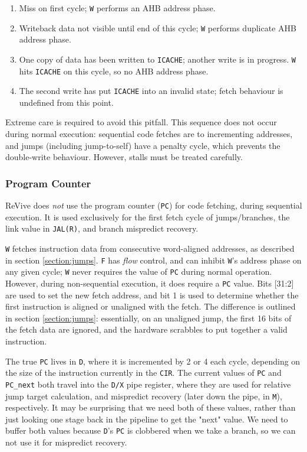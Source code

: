 \documentclass{article}
\begin{document}
\begin{enumerate}
	\item Miss on first cycle; \texttt{W} performs an AHB address phase.
	\item Writeback data not visible until end of this cycle; \texttt{W} performs duplicate AHB address phase.
	\item One copy of data has been written to \texttt{ICACHE}; another write is in progress. \texttt{W} hits \texttt{ICACHE} on this cycle, so no AHB address phase.
	\item The second write has put \texttt{ICACHE} into an invalid state; fetch behaviour is undefined from this point.
\end{enumerate}

Extreme care is required to avoid this pitfall. This sequence does not occur during normal execution: sequential code fetches are to incrementing addresses, and jumps (including jump-to-self) have a penalty cycle, which prevents the double-write behaviour. However, stalls must be treated carefully.

\subsubsection{Program Counter}

ReVive does \textit{not} use the program counter (\texttt{PC}) for code fetching, during sequential execution. It is used exclusively for the first fetch cycle of jumps/branches, the link value in \texttt{JAL(R)}, and branch mispredict recovery.

\texttt{W} fetches instruction data from consecutive word-aligned addresses, as described in section \ref{section:jumps}. \texttt{F} has \textit{flow} control, and can inhibit \texttt{W}'s address phase on any given cycle; \texttt{W} never requires the value of \texttt{PC} during normal operation. However, during non-sequential execution, it does require a \texttt{PC} value. Bits [31:2] are used to set the new fetch address, and bit 1 is used to determine whether the first instruction is aligned or unaligned with the fetch. The difference is outlined in section \ref{section:jumps}: essentially, on an unaligned jump, the first 16 bits of the fetch data are ignored, and the hardware scrabbles to put together a valid instruction.

The true \texttt{PC} lives in \texttt{D}, where it is incremented by 2 or 4 each cycle, depending on the size of the instruction currently in the \texttt{CIR}. The current values of \texttt{PC} and \texttt{PC\_next} both travel into the \texttt{D/X} pipe register, where they are used for relative jump target calculation, and mispredict recovery (later down the pipe, in \texttt{M}), respectively. It may be surprising that we need both of these values, rather than just looking one stage back in the pipeline to get the "next" value. We need to buffer both values because \texttt{D}'s \texttt{PC} is clobbered when we take a branch, so we can not use it for mispredict recovery.
\end{document}
